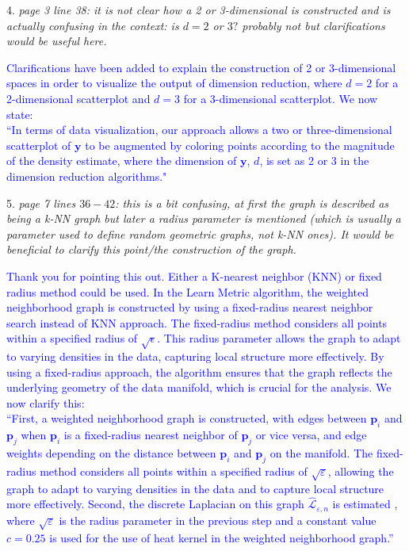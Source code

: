 \documentclass{article}
\begin{document}
4. \textit{page 3 line 38: it is not clear how a 2 or 3-dimensional is constructed and is actually confusing in the context: is \(d=2\) or \(3?\) probably not but clarifications would be useful here.}

   \textcolor{blue}{
   Clarifications have been added to explain the construction of 2 or 3-dimensional spaces in order to visualize the output of dimension reduction, where \(d=2\) for a 2-dimensional scatterplot and \(d=3\) for a 3-dimensional scatterplot. We now state: \\
  ``In terms of data visualization, our approach allows a two or three-dimensional scatterplot of \(\bm{y}\) to be augmented by coloring points according to the magnitude of the density estimate, where the dimension of \(\bm{y}\), \(d\), is set as 2 or 3 in the dimension reduction algorithms."
   }

5. \textit{page 7 lines \(36-42\): this is a bit confusing, at first the graph is described as being a k-NN graph but later a radius parameter is mentioned (which is usually a parameter used to define random geometric graphs, not k-NN ones). It would be beneficial to clarify this point/the construction of the graph.}

   \textcolor{blue}{
   Thank you for pointing this out. Either a K-nearest neighbor (KNN) or fixed radius method could be used. In the Learn Metric algorithm, the weighted neighborhood graph is constructed by using a fixed-radius nearest neighbor search instead of KNN approach. The fixed-radius method considers all points within a specified radius of \(\sqrt{\epsilon}\). This radius parameter allows the graph to adapt to varying densities in the data, capturing local structure more effectively. By using a fixed-radius approach, the algorithm ensures that the graph reflects the underlying geometry of the data manifold, which is crucial for the analysis. We now clarify this: \\
   ``First, a weighted neighborhood graph is constructed, with edges between \(\bm{p}_i\) and \(\bm{p}_j\) when \(\bm{p}_i\) is a fixed-radius nearest neighbor of \(\bm{p}_j\) or vice versa, and edge weights depending on the distance between \(\bm{p}_i\) and \(\bm{p}_j\) on the manifold. The fixed-radius method considers all points within a specified radius of \(\sqrt{\varepsilon}\), allowing the graph to adapt to varying densities in the data and to capture local structure more effectively. Second, the discrete Laplacian on this graph \(\hat{\mathcal{L}}_{\varepsilon,n}\) is estimated \autocite{Zhou2011-za}, where \(\sqrt{\varepsilon}\) is the radius parameter in the previous step and a constant value $c=0.25$ is used for the use of heat kernel in the weighted neighborhood graph.''
   }
\end{document}
